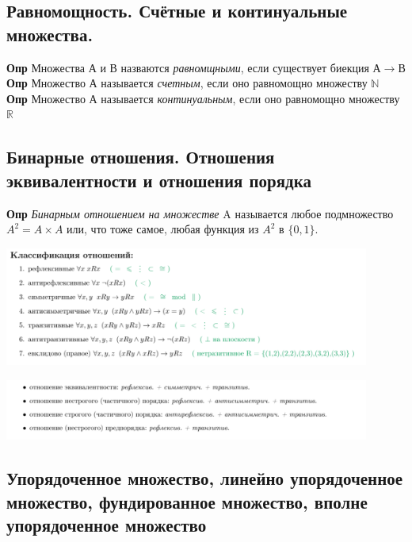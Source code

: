 \subsection{Равномощность. Счётные и континуальные множества.}

\textbf{Опр} Множества А и В назваются \textit{равномщными}, если существует биекция $А \to В$
\\
\textbf{Опр} Множество А называется \textit{счетным}, если оно равномощно множеству $\mathbb{N}$
\\
\textbf{Опр} Множество А называется \textit{континуальным}, если оно равномощно множеству $\mathbb{R}$
\\
\subsection{Бинарные отношения. Отношения эквивалентности и отношения порядка}

\textbf{Опр} \textit{Бинарным отношением на множестве}  A называется любое подмножество $A^2 = A \times A$ или, что тоже
самое, любая функция из $A^2$ в $\{0,1\}$.
\begin{center}
    \includegraphics[width = 0.9\textwidth]{images/2 (определения)_m22.PNG}

    \includegraphics[width = 0.9\textwidth]{images/2 (определения)_m23.PNG}
\end{center}

\subsection{Упорядоченное множество, линейно упорядоченное множество, фундированное множество, вполне упорядоченное множество}

